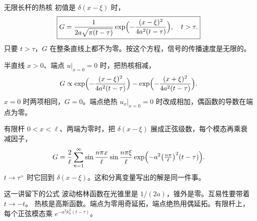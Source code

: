 \documentclass[fontset=windows, chinese, 10pt, xcolor=dvipsnames]{beamer}
\begin{document}
\begin{frame}{无限长杆的热核}
  初值是 $\delta(x-\xi)$ 时，
  \begin{equation*}
    \boxed{\displaystyle
    G
    =\frac{1}{2a\sqrt{\pi(t-\tau)}}
      \exp\Bigl(-\frac{(x-\xi)^2}{4a^2(t-\tau)}\Bigr),
    \quad t>\tau.}
  \end{equation*}
  只要 $t>\tau$，$G$ 在整条直线上都不为零。按这个方程，信号的传播速度是无限的。
\end{frame}

\begin{frame}{半直线}
  $x>0$、端点 $u|_{x=0}=0$ 时，把热核相减，
  \[
    G\propto
    \exp\Bigl(-\frac{(x-\xi)^2}{4a^2(t-\tau)}\Bigr)
    -\exp\Bigl(-\frac{(x+\xi)^2}{4a^2(t-\tau)}\Bigr).
  \]
  $x=0$ 时两项相同，$G=0$。端点绝热 $u_x|_{x=0}=0$ 时改成相加，偶函数的导数在端点为零。
\end{frame}

\begin{frame}{有限杆}
  $0<x<\ell$、两端为零时，把 $\delta(x-\xi)$ 展成正弦级数，每个模态再乘衰减因子，
  \[
    G
    =\frac{2}{\ell}\sum_{n=1}^{\infty}
      \sin\frac{n\pi x}{\ell}
      \sin\frac{n\pi\xi}{\ell}
      \exp\Bigl(-a^2\bigl(\tfrac{n\pi}{\ell}\bigr)^2(t-\tau)\Bigr).
  \]
  $t\to\tau^+$ 时它回到 $\delta(x-\xi)$。这和分离变量写出的解是同一件事。
\end{frame}

\begin{frame}{这一讲留下的公式}
  波动格林函数在光锥里是 $1/(2a)$，锥外是零。互易性要带着 $t\to -t$。
  \vspace{0.35em}
  热核是高斯函数。端点为零用奇延拓，端点绝热用偶延拓。有限杆上，每个正弦模态乘 $e^{-a^2 k_n^2(t-\tau)}$。
\end{frame}
\end{document}
